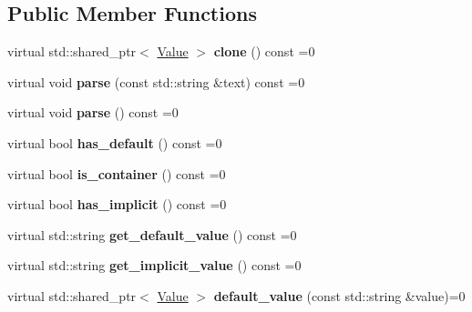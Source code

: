 \subsection*{Public Member Functions}
\begin{DoxyCompactItemize}
\item 
virtual std\+::shared\+\_\+ptr$<$ \hyperlink{classcxxopts_1_1Value}{Value} $>$ {\bfseries clone} () const =0\hypertarget{classcxxopts_1_1Value_a03142d85ac55cee54732a2034e47d40f}{}\label{classcxxopts_1_1Value_a03142d85ac55cee54732a2034e47d40f}

\item 
virtual void {\bfseries parse} (const std\+::string \&text) const =0\hypertarget{classcxxopts_1_1Value_a3c962e4ff3294721f5c9f6ac3fc00cc7}{}\label{classcxxopts_1_1Value_a3c962e4ff3294721f5c9f6ac3fc00cc7}

\item 
virtual void {\bfseries parse} () const =0\hypertarget{classcxxopts_1_1Value_a9246a55e299ea5ef34346af46977fab4}{}\label{classcxxopts_1_1Value_a9246a55e299ea5ef34346af46977fab4}

\item 
virtual bool {\bfseries has\+\_\+default} () const =0\hypertarget{classcxxopts_1_1Value_aac3233a0414ac39d54ed0b98365afc7e}{}\label{classcxxopts_1_1Value_aac3233a0414ac39d54ed0b98365afc7e}

\item 
virtual bool {\bfseries is\+\_\+container} () const =0\hypertarget{classcxxopts_1_1Value_a632f3263dd598e30999a6bcff0652132}{}\label{classcxxopts_1_1Value_a632f3263dd598e30999a6bcff0652132}

\item 
virtual bool {\bfseries has\+\_\+implicit} () const =0\hypertarget{classcxxopts_1_1Value_aac3425b87db8ef41157892449999b183}{}\label{classcxxopts_1_1Value_aac3425b87db8ef41157892449999b183}

\item 
virtual std\+::string {\bfseries get\+\_\+default\+\_\+value} () const =0\hypertarget{classcxxopts_1_1Value_a25ac95c499771a6f5ca295e01452f380}{}\label{classcxxopts_1_1Value_a25ac95c499771a6f5ca295e01452f380}

\item 
virtual std\+::string {\bfseries get\+\_\+implicit\+\_\+value} () const =0\hypertarget{classcxxopts_1_1Value_a436f0a8a6621de420088839f4c728230}{}\label{classcxxopts_1_1Value_a436f0a8a6621de420088839f4c728230}

\item 
virtual std\+::shared\+\_\+ptr$<$ \hyperlink{classcxxopts_1_1Value}{Value} $>$ {\bfseries default\+\_\+value} (const std\+::string \&value)=0\hypertarget{classcxxopts_1_1Value_ad30c339238f27e887707a29b10c55382}{}\label{classcxxopts_1_1Value_ad30c339238f27e887707a29b10c55382}


\end{DoxyCompactItemize}
